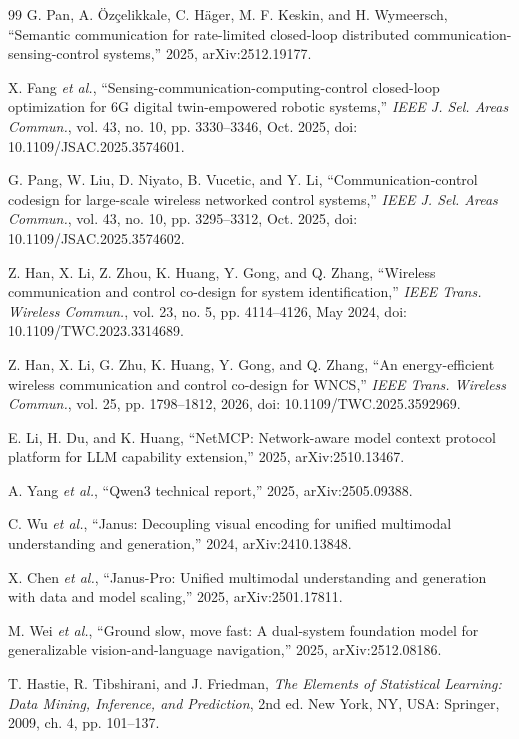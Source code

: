\documentclass[letterpaper,journal]{IEEEtran}
\newcommand{\etal}{\emph{et al.}}
\begin{document}
\begin{thebibliography}{99}
G. Pan, A. \"Oz\c{c}elikkale, C. H\"ager, M. F. Keskin, and H. Wymeersch,
``Semantic communication for rate-limited closed-loop distributed
communication-sensing-control systems,'' 2025, arXiv:2512.19177.

X. Fang \etal, ``Sensing-communication-computing-control closed-loop
optimization for 6G digital twin-empowered robotic systems,'' \emph{IEEE J.
Sel. Areas Commun.}, vol. 43, no. 10, pp. 3330--3346, Oct. 2025,
doi: 10.1109/JSAC.2025.3574601.

G. Pang, W. Liu, D. Niyato, B. Vucetic, and Y. Li,
``Communication-control codesign for large-scale wireless networked control
systems,'' \emph{IEEE J. Sel. Areas Commun.}, vol. 43, no. 10,
pp. 3295--3312, Oct. 2025,
doi: 10.1109/JSAC.2025.3574602.

Z. Han, X. Li, Z. Zhou, K. Huang, Y. Gong, and Q. Zhang, ``Wireless
communication and control co-design for system identification,'' \emph{IEEE
Trans. Wireless Commun.}, vol. 23, no. 5, pp. 4114--4126, May 2024,
doi: 10.1109/TWC.2023.3314689.

Z. Han, X. Li, G. Zhu, K. Huang, Y. Gong, and Q. Zhang, ``An energy-efficient
wireless communication and control co-design for WNCS,'' \emph{IEEE Trans.
Wireless Commun.}, vol. 25, pp. 1798--1812, 2026,
doi: 10.1109/TWC.2025.3592969.

E. Li, H. Du, and K. Huang, ``NetMCP: Network-aware model context protocol
platform for LLM capability extension,'' 2025, arXiv:2510.13467.

A. Yang \etal, ``Qwen3 technical report,'' 2025, arXiv:2505.09388.

C. Wu \etal, ``Janus: Decoupling visual encoding for unified multimodal
understanding and generation,'' 2024, arXiv:2410.13848.

X. Chen \etal, ``Janus-Pro: Unified multimodal understanding and generation with data and
model scaling,'' 2025, arXiv:2501.17811.

M. Wei \etal, ``Ground slow, move fast: A dual-system foundation model for
generalizable vision-and-language navigation,'' 2025, arXiv:2512.08186.

T. Hastie, R. Tibshirani, and J. Friedman, \emph{The Elements of Statistical
Learning: Data Mining, Inference, and Prediction}, 2nd ed. New York, NY, USA:
Springer, 2009, ch. 4, pp. 101--137.


\end{thebibliography}
\end{document}
